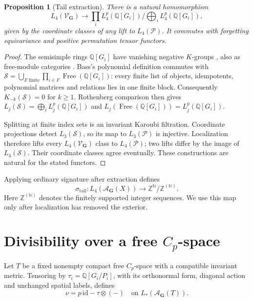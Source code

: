 \documentclass[11pt]{amsart}
\numberwithin{equation}{section}
\newtheorem{proposition}[proposition]{Proposition}
\theoremstyle{definition}
\theoremstyle{remark}
\DeclareMathOperator{\Free}{Free}
\newcommand{\Q}{\mathbb Q}
\newcommand{\Z}{\mathbb Z}
\begin{document}
\begin{proposition}[Tail extraction]\label{alg:extraction}
There is a natural homomorphism
\begin{equation}\label{alg:tail-isomorphism}
 L_4(\mathcal V_{\mathbf G})\longrightarrow
 \prod_iL_4^p(\Q[G_i])/\bigoplus_iL_4^p(\Q[G_i]),
\end{equation}
given by the coordinate classes of any lift to $L_4(\mathcal P)$.
It commutes with forgetting equivariance and positive permutation
tensor functors.
\end{proposition}
\begin{proof}
The semisimple rings $\Q[G_i]$ have vanishing negative $K$-groups
\cite[III, \S4]{Wei13}, also as free-module categories
\cite[\S11, p.~101]{Ran92}. Bass's polynomial definition commutes with
$\mathcal S=\bigcup_{F\text{ finite}}\prod_{i\in F}\Free(\Q[G_i])$:
every finite list of objects, idempotents, polynomial matrices and
relations lies in one finite block. Consequently $K_{-k}(\mathcal S)=0$
for $k\ge1$. Rothenberg comparison then gives
$L_j(\mathcal S)=\bigoplus_iL_j^p(\Q[G_i])$ and
$L_j(\Free(\Q[G_i]))=L_j^p(\Q[G_i])$.

Splitting at finite index sets is an invariant Karoubi filtration.
Coordinate projections detect $L_3(\mathcal S)$, so its map to
$L_3(\mathcal P)$ is injective. Localization therefore lifts every
$L_4(\mathcal V_{\mathbf G})$ class to $L_4(\mathcal P)$; two lifts
differ by the image of $L_4(\mathcal S)$. Their coordinate classes
agree eventually. These constructions are natural for the stated
functors.
\end{proof}

Applying ordinary signature after extraction defines
\begin{equation}\label{alg:signature-tail}
 \sigma_{\mathrm{tail}}:L_4(\mathcal A_{\mathbf G}(X))\longrightarrow
 \Z^{\mathbb N}/\Z^{(\mathbb N)}.
\end{equation}
Here $\Z^{(\mathbb N)}$ denotes the finitely supported integer sequences.
We use this map only after localization has removed the exterior.

\section{Divisibility over a free \texorpdfstring{$C_p$}{C(p)}-space}
\label{alg:obstruction}

Let $T$ be a fixed nonempty compact free $C_p$-space with a compatible
invariant metric.
Tensoring by $\tau_i=\Q[G_i/P_i]$, with its orthonormal form,
diagonal action and unchanged spatial labels, defines
\begin{equation}\label{alg:nu}
 \nu=p\,\mathrm{id}-\tau\otimes(-)
 \quad\text{on }L_*(\mathcal A_{\mathbf G}(T)).
\end{equation}
\end{document}
